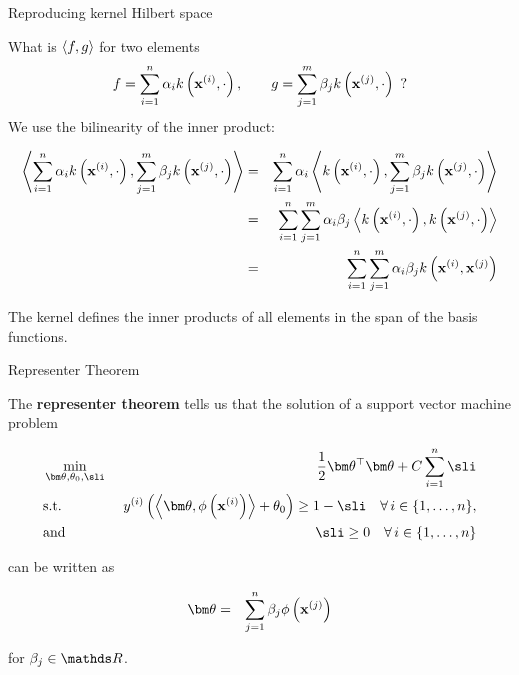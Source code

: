 \documentclass[11pt,compress,t,notes=noshow, xcolor=table]{beamer}
\begin{document}
\begin{vbframe}{Reproducing kernel Hilbert space}
\framebreak

  What is $\left\langle f, g \right\rangle$ for two elements
  $$
    f = \sum_{i=1}^n \alpha_i k\left(\mathbf{x}^{(i)}, \cdot\right), \qquad g = \sum_{j=1}^m \beta_j k\left(\mathbf{x}^{(j)}, \cdot\right)
    \enspace?
  $$
  We use the bilinearity of the inner product:
  \begin{small}
  \begin{eqnarray*}
    \left\langle \sum_{i=1}^n \alpha_i k\left(\mathbf{x}^{(i)}, \cdot\right),  \sum_{j=1}^m \beta_j k\left(\mathbf{x}^{(j)}, \cdot\right) \right\rangle
    &=& \sum_{i=1}^n \alpha_i \left\langle k\left(\mathbf{x}^{(i)}, \cdot\right), \sum_{j=1}^m \beta_j k\left(\mathbf{x}^{(j)}, \cdot\right) \right\rangle \\
    &=& \sum_{i=1}^n \sum_{j=1}^m \alpha_i \beta_j \left\langle k\left(\mathbf{x}^{(i)}, \cdot\right), k\left(\mathbf{x}^{(j)}, \cdot\right) \right\rangle \\
    &=& \sum_{i=1}^n \sum_{j=1}^m \alpha_i \beta_j k\left(\mathbf{x}^{(i)}, \mathbf{x}^{(j)}\right)
  \end{eqnarray*}
  \end{small}
  The kernel defines the inner products of all elements
  in the span of the basis functions.

\end{vbframe}

\begin{vbframe}{Representer Theorem}

The \textbf{representer theorem} tells us that the solution of a support vector machine problem 

\vspace*{-0.5cm}

\begin{eqnarray*}
  & \min\limits_{\thetav, \theta_0,\sli} & \frac{1}{2} \thetav^\top \thetav + C   \sum_{i=1}^n \sli \\
  & \text{s.t.} & \,\, \yi  \left( \scp{\thetav}{\phi\left(\xi\right)} + \theta_0 \right) \geq 1 - \sli \quad \forall\, i \in \nset,\\
  & \text{and} & \,\, \sli \geq 0 \quad \forall\, i \in \nset\\
\end{eqnarray*}

\vspace*{-0.5cm}

can be written as 

\begin{eqnarray*}
  \thetav &=& \sum_{j = 1}^n \beta_j \phi\left(\xv^{(j)}\right)
  \end{eqnarray*}

for $\beta_j \in \R$. 

\end{vbframe}
\end{document}
